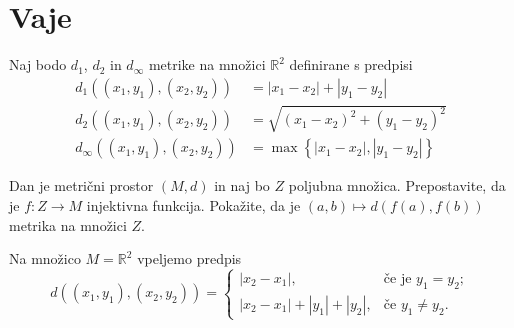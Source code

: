 \documentclass[11pt,a4paper]{exam}
\renewcommand{\{}{\lbrace}
\renewcommand{\}}{\rbrace}
\begin{document}
\section*{Vaje}
\begin{questions}
	\question Naj bodo $d_{1}$, $d_{2}$ in $d_{\infty}$ metrike na množici $\mathbb{R}^{2}$ definirane s predpisi
		\begin{align*}
			d_{1}\left( (x_{1}, y_{1}), (x_{2}, y_{2}) \right) &= |x_{1} - x_{2}| + |y_{1} - y_{2}| \\
			d_{2}\left( (x_{1}, y_{1}), (x_{2}, y_{2}) \right) &= \sqrt{(x_{1} - x_{2})^{2} + (y_{1} - y_{2})^{2}} \\
			d_{\infty}\left( (x_{1}, y_{1}), (x_{2}, y_{2}) \right) &= \max\left\{ |x_{1} - x_{2}|, |y_{1} - y_{2}| \right\}
		\end{align*}

	\question Dan je metrični prostor $(M,d)$ in naj bo $Z$ poljubna množica. Prepostavite, da je $f \colon Z \to M$ injektivna funkcija. Pokažite, da je $(a,b) \mapsto d(f(a), f(b))$ metrika na množici $Z$.


	\question Na množico $M = \mathbb{R}^{2}$ vpeljemo predpis 
		\[d\left( (x_{1}, y_{1}), (x_{2}, y_{2}) \right)=
		\begin{cases}
			|x_{2} - x_{1}|, &\text{če je } y_{1} = y_{2}; \\
			|x_{2} - x_{1}| + |y_{1}| + |y_{2}|, & \text{če } y_{1} \neq y_{2}.
		\end{cases}
		\]
		

\end{questions}
\end{document}
